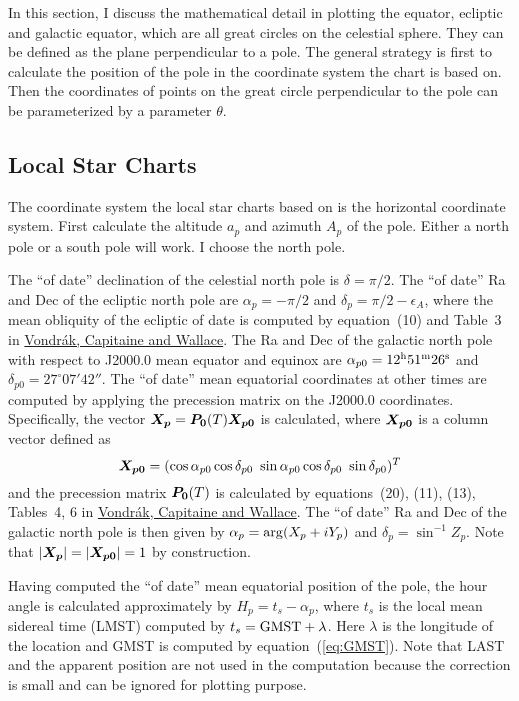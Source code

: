 \documentclass[12pt]{article}
\newcommand \beq {\begin{equation}}
\newcommand \eeq {\end{equation}}
\newcommand{\ve}[1]{\mbox{\boldmath $#1$}}
\begin{document}
In this section, I discuss the mathematical detail in plotting the 
equator, ecliptic and galactic equator, which are all great circles on 
the celestial sphere. They can be defined as the plane perpendicular to 
a pole. The general strategy is first to calculate the position of the pole 
in the coordinate system the chart is based on. Then the coordinates of points 
on the great circle perpendicular to the pole can be parameterized by a parameter 
$\theta$.

\subsection{Local Star Charts} 

The coordinate system the local star charts based on is the horizontal 
coordinate system. First calculate the altitude $a_p$ and azimuth $A_p$ 
of the pole. Either a north pole or a south pole will work. I choose the 
north pole. 

The ``of date'' declination of the celestial north pole is $\delta=\pi/2$. 
The ``of date'' Ra and Dec of the ecliptic north pole are $\alpha_p=-\pi/2$ and 
$\delta_p = \pi/2-\epsilon_A$, where the mean obliquity of the ecliptic of date 
is computed by equation~(10) and Table~3 in
\href{https://ui.adsabs.harvard.edu/abs/2011A%26A...534A..22V/abstract}{Vondr\'ak,
Capitaine and Wallace}. 
The Ra and Dec of the galactic north pole with respect to J2000.0 mean equator 
and equinox are $\alpha_{p0} = 12^{\rm h} 51^{\rm m} 26^{\rm s}$ and 
$\delta_{p0} = 27^\circ 07' 42''$. The ``of date'' mean equatorial coordinates 
at other times are computed
by applying the precession matrix on the J2000.0 coordinates. Specifically, 
the vector $\ve{X_p}=\ve{P_0}(T) \ve{X_{p0}}$ is calculated, where $\ve{X_{p0}}$ is 
a column vector defined as 
\beq
  \ve{X_{p0}}=(\cos \alpha_{p0} \cos \delta_{p0}\ \sin \alpha_{p0} \cos \delta_{p0} \ 
\sin \delta_{p0})^T
\eeq
and the precession matrix $\ve{P_0}(T)$ is calculated by 
equations~(20), (11), (13), Tables~4, 6 in 
\href{https://ui.adsabs.harvard.edu/abs/2011A%26A...534A..22V/abstract}{Vondr\'ak, Capitaine and Wallace}. 
The ``of date'' Ra and Dec of the galactic north pole is then given by 
$\alpha_p = {\rm arg}(X_p+iY_p)$ and $\delta_p = \sin^{-1} Z_p$. 
Note that $|\ve{X_p}|=|\ve{X_{p0}}|=1$ by construction.

Having computed the ``of date'' mean equatorial position of the pole, the hour angle 
is calculated approximately by $H_p=t_s - \alpha_p$, where $t_s$ is the local mean 
sidereal time (LMST) computed by $t_s = {\rm GMST}+\lambda$. 
Here $\lambda$ is the longitude of the location and GMST is computed
by equation~(\ref{eq:GMST}). Note that LAST and the apparent position are not 
used in the computation because the correction is
small and can be ignored for plotting purpose.
\end{document}
